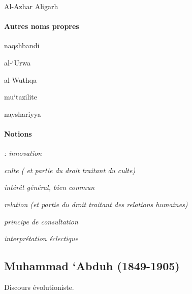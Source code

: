 Al-Azhar Aligarh

\paragraph{Autres noms propres}

naqshbandi

al-`Urwa

al-Wuthqa

mu`tazilite

nayshariyya

\paragraph{Notions}

\begin{Def}
\emph{: innovation}
\end{Def} 

\begin{Def}

 \emph{ culte ( et partie du droit traitant du culte)}
\end{Def} 
 

\begin{Def}[maslaha]
 \emph{intérêt général, bien commun}
\end{Def} 

\begin{Def}
  \emph{ relation (et partie du droit traitant des
relations humaines)} 
\end{Def} 



\begin{Def}[qasd]
 \emph{ principe de consultation}
\end{Def} 

\begin{Def}[talfiq]
  \emph{interprétation
éclectique}
\end{Def} 




\hypertarget{muhammad-abduh-1849-1905}{%
\subsection{\texorpdfstring{{Muhammad `Abduh}
(1849-1905)}{Muhammad `Abduh (1849-1905)}}\label{muhammad-abduh-1849-1905}}

Discours évolutioniste.

